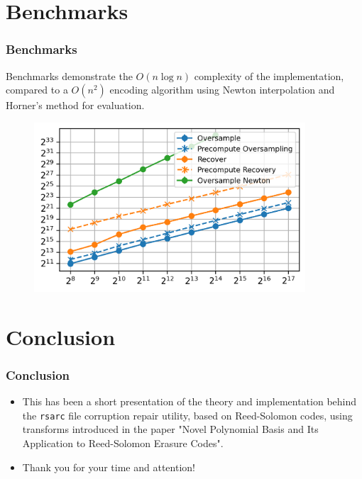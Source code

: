 \documentclass{beamer}
\begin{document}
\section{Benchmarks}
\begin{frame}
\frametitle{Benchmarks}

Benchmarks demonstrate the $O(n \log n)$ complexity of the implementation, compared to a $O(n^2)$ encoding algorithm using Newton interpolation and Horner's method for evaluation.

\begin{figure}
\begin{center}
\includegraphics[width=0.9\textwidth]{benchmarks_log_poly.png}
\end{center}
\end{figure}

\end{frame}

\section{Conclusion}
\begin{frame}
\frametitle{Conclusion}

\begin{itemize}
\item
This has been a short presentation of the theory and implementation behind the \texttt{rsarc} file corruption repair utility, based on Reed-Solomon codes,
using transforms introduced in the paper "Novel Polynomial Basis and Its Application to Reed-Solomon Erasure Codes".

\item
Thank you for your time and attention!

\end{itemize}
\end{frame}
\end{document}
